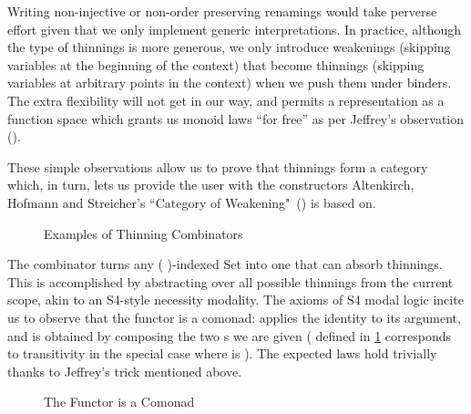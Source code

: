 Writing non-injective or non-order preserving renamings would take perverse effort
given that we only implement generic interpretations. In practice, although the type
of thinnings is more generous, we only introduce weakenings (skipping variables at
the beginning of the context) that become thinnings (skipping variables at arbitrary
points in the context) when we push them under binders. The extra flexibility will not
get in our way, and permits a representation as a function space which grants us monoid
laws ``for free'' as per Jeffrey's observation (\citeyear{jeffrey2011assoc}).

These simple observations allow us to prove that thinnings form a category which,
in turn, lets us provide the user with the constructors Altenkirch, Hofmann and
Streicher's ``Category of Weakening"~(\citeyear{altenkirch1995categorical}) is based on.

\begin{figure}[h]
\begin{minipage}{0.5\textwidth}
\end{minipage}\begin{minipage}{0.5\textwidth}
\end{minipage}

\caption{Examples of Thinning Combinators\label{fig:extendth}}
\end{figure}

The  combinator turns any ( )-indexed Set into one that can
absorb thinnings. This is accomplished by abstracting over all possible thinnings
from the current scope, akin to an S4-style necessity modality. The axioms of S4
modal logic incite us to observe that the functor  is a comonad: 
applies the identity  to its argument, and  is obtained
by composing the two s we are given ( defined in
\cref{fig:extendth} corresponds to transitivity in the special case where 
is ). The expected laws hold trivially thanks to Jeffrey's trick mentioned above.

\begin{figure}[h]
\begin{minipage}{0.5\textwidth}
\end{minipage}\begin{minipage}{0.5\textwidth}
\end{minipage}
\caption{The  Functor is a Comonad}
\end{figure}


